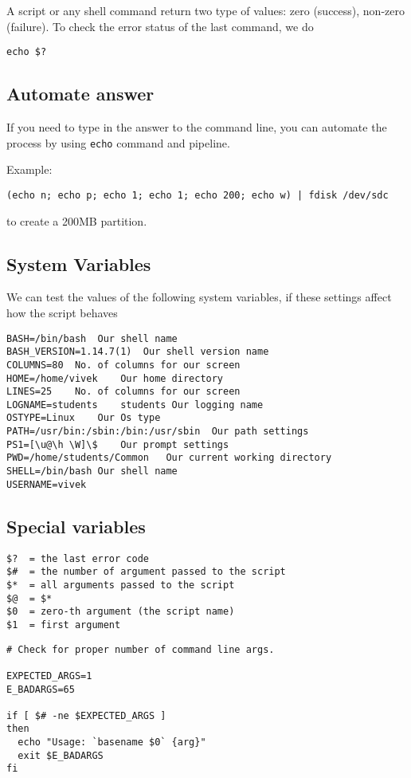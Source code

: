 A script or any shell command return two type of values: zero (success),
non-zero (failure). To check the error status of the last command, we do
\begin{verbatim}
echo $?
\end{verbatim}

\subsection{Automate answer}

If you need to type in the answer to the command line, you can automate the
process by using \verb!echo! command and pipeline.

Example:
\begin{verbatim}
(echo n; echo p; echo 1; echo 1; echo 200; echo w) | fdisk /dev/sdc
\end{verbatim}
to create a 200MB partition.



\subsection{System Variables}

We can test the values of the following system variables, if these settings
affect how the script behaves
\begin{verbatim}
BASH=/bin/bash	Our shell name
BASH_VERSION=1.14.7(1)	Our shell version name
COLUMNS=80	No. of columns for our screen
HOME=/home/vivek	Our home directory
LINES=25	No. of columns for our screen
LOGNAME=students	students Our logging name
OSTYPE=Linux	Our Os type
PATH=/usr/bin:/sbin:/bin:/usr/sbin	Our path settings
PS1=[\u@\h \W]\$	Our prompt settings
PWD=/home/students/Common	Our current working directory
SHELL=/bin/bash	Our shell name
USERNAME=vivek
\end{verbatim}

\subsection{Special variables}

\begin{verbatim}
$?  = the last error code
$#  = the number of argument passed to the script
$*  = all arguments passed to the script
$@  = $*
$0  = zero-th argument (the script name)
$1  = first argument 
\end{verbatim}

\begin{verbatim}
# Check for proper number of command line args.

EXPECTED_ARGS=1
E_BADARGS=65

if [ $# -ne $EXPECTED_ARGS ]
then
  echo "Usage: `basename $0` {arg}"
  exit $E_BADARGS
fi
\end{verbatim}


